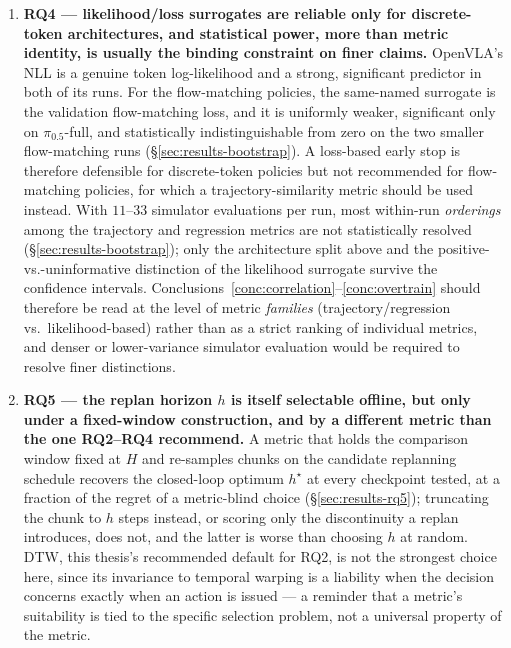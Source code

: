 \documentclass[english,12pt,a4paper,pdftex,elec,utf8]{aaltothesis}
\begin{document}
\begin{enumerate}
  \item \textbf{RQ4 --- likelihood/loss surrogates are reliable only for discrete-token architectures, and statistical power, more than metric identity, is usually the binding constraint on finer claims.}
    \label{conc:nll}
    OpenVLA's NLL is a genuine token log-likelihood and a strong, significant predictor in both of its runs. For the flow-matching policies, the same-named surrogate is the validation flow-matching loss, and it is uniformly weaker, significant only on $\pi_{0.5}$-full, and statistically indistinguishable from zero on the two smaller flow-matching runs (\S\ref{sec:results-bootstrap}). A loss-based early stop is therefore defensible for discrete-token policies but not recommended for flow-matching policies, for which a trajectory-similarity metric should be used instead.
    \label{conc:power}
    With $11$--$33$ simulator evaluations per run, most within-run \emph{orderings} among the trajectory and regression metrics are not statistically resolved (\S\ref{sec:results-bootstrap}); only the architecture split above and the positive-vs.-uninformative distinction of the likelihood surrogate survive the confidence intervals. Conclusions~\ref{conc:correlation}--\ref{conc:overtrain} should therefore be read at the level of metric \emph{families} (trajectory/regression vs.\ likelihood-based) rather than as a strict ranking of individual metrics, and denser or lower-variance simulator evaluation would be required to resolve finer distinctions.

  \item \textbf{RQ5 --- the replan horizon $h$ is itself selectable offline, but only under a fixed-window construction, and by a different metric than the one RQ2--RQ4 recommend.}
    \label{conc:replan}
    A metric that holds the comparison window fixed at $H$ and re-samples chunks on the candidate replanning schedule recovers the closed-loop optimum $h^\star$ at every checkpoint tested, at a fraction of the regret of a metric-blind choice (\S\ref{sec:results-rq5}); truncating the chunk to $h$ steps instead, or scoring only the discontinuity a replan introduces, does not, and the latter is worse than choosing $h$ at random. DTW, this thesis's recommended default for RQ2, is not the strongest choice here, since its invariance to temporal warping is a liability when the decision concerns exactly when an action is issued --- a reminder that a metric's suitability is tied to the specific selection problem, not a universal property of the metric.
\end{enumerate}
\end{document}
